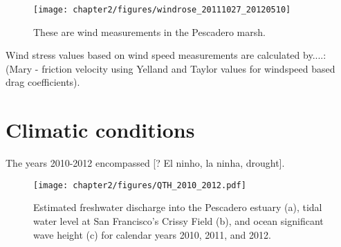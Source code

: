  \begin{figure}
 	\begin{center}
 		\texttt{[image: chapter2/figures/windrose\_20111027\_20120510]} \caption{These are wind measurements in the Pescadero marsh.} \label{fig:metstn_pdo_windrose} 
 	\end{center}
 \end{figure}


Wind stress values based on wind speed measurements are calculated
by....:  (Mary - friction velocity using Yelland and Taylor values for
windspeed based drag coefficients).

% 
% 
\section{Climatic conditions} \label{conditions_label}

The years 2010-2012 encompassed [? El ninho, la ninha, drought].



\begin{figure}
	\begin{center}
		\texttt{[image: chapter2/figures/QTH\_2010\_2012.pdf]} \caption{Estimated freshwater discharge into the Pescadero estuary (a), tidal water level at San Francisco's Crissy Field (b), and ocean significant wave height (c) for calendar years 2010, 2011, and 2012.}\label{fig:QTH_2010_2012}  
	\end{center}
\end{figure}

